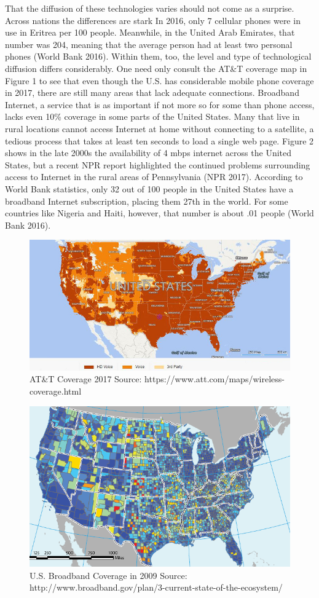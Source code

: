 \documentclass[12pt]{article}
\begin{document}
	That the diffusion of these technologies varies should not come as a surprise. Across nations the differences are stark In 2016, only 7 cellular phones were in use in Eritrea per 100 people. Meanwhile, in the United Arab Emirates, that number was 204, meaning that the average person had at least two personal phones (World Bank 2016). Within them, too, the level and type of technological diffusion differs considerably. One need only consult the AT\&T coverage map in Figure 1 to see that even though the U.S. has considerable mobile phone coverage in 2017, there are still many areas that lack adequate connections. Broadband Internet, a service that is as important if not more so for some than phone access, lacks even 10\% coverage in some parts of the United States. Many that live in rural locations cannot access Internet at home without connecting to a satellite, a tedious process that takes at least ten seconds to load a single web page. Figure 2 shows in the late 2000s the availability of 4 mbps internet across the United States, but a recent NPR report highlighted the continued problems surrounding access to Internet in the rural areas of Pennsylvania (NPR 2017). According to World Bank statistics, only 32 out of 100 people in the United States have a broadband Internet subscription, placing them 27th in the world. For some countries like Nigeria and Haiti, however, that number is about .01 people (World Bank 2016).
	
	\begin{figure}[H]
		\centering
		\includegraphics[width=0.7\linewidth]{at&t-coverage-map}
		\caption{AT\&T Coverage 2017 Source: https://www.att.com/maps/wireless-coverage.html}
		\label{fig:att-coverage-map}
	\end{figure}
	\begin{figure}[H]
		\centering
		\includegraphics[width=0.7\linewidth]{"us broadband"}
		\caption{U.S. Broadband Coverage in 2009 Source: http://www.broadband.gov/plan/3-current-state-of-the-ecosystem/}
		\label{fig:us-broadband}
	\end{figure}
	
\end{document}
